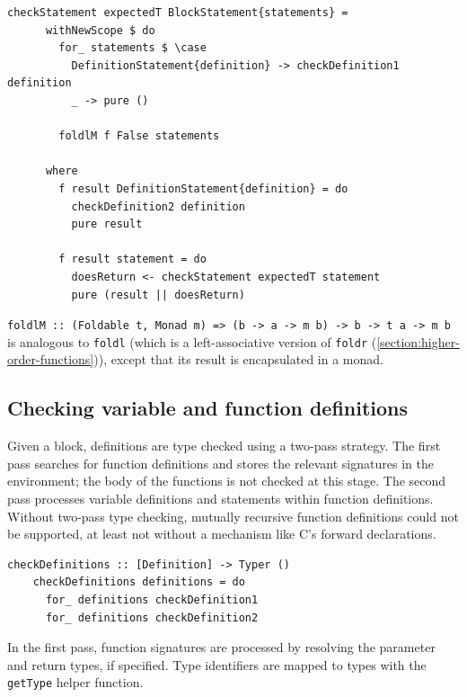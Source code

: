\documentclass[UdineBachThesis,american,11pt]{PhdThesis}
\begin{document}
  \begin{Verbatim}[gobble=4,fontsize=\small]
    checkStatement expectedT BlockStatement{statements} =
      withNewScope $ do
        for_ statements $ \case
          DefinitionStatement{definition} -> checkDefinition1 definition
          _ -> pure ()

        foldlM f False statements

      where
        f result DefinitionStatement{definition} = do
          checkDefinition2 definition
          pure result

        f result statement = do
          doesReturn <- checkStatement expectedT statement
          pure (result || doesReturn)
  \end{Verbatim}

  \mbox{\texttt{foldlM :: (Foldable t, Monad m) => (b -> a -> m b) -> b -> t a -> m b}}
  is analogous to \mbox{\texttt{foldl}} (which is a left-associative version of
  \mbox{\texttt{foldr}} (\autoref{section:higher-order-functions})), except that
  its result is encapsulated in a monad.

  \subsection{Checking variable and function definitions}

  Given a block, definitions are type checked using a two-pass strategy. The
  first pass searches for function definitions and stores the relevant
  signatures in the environment; the body of the functions is not checked at
  this stage. The second pass processes variable definitions and statements
  within function definitions. Without two-pass type checking, mutually
  recursive function definitions could not be supported, at least not without a
  mechanism like C's forward declarations.

  \begin{Verbatim}[gobble=4,fontsize=\small]
    checkDefinitions :: [Definition] -> Typer ()
    checkDefinitions definitions = do
      for_ definitions checkDefinition1
      for_ definitions checkDefinition2
  \end{Verbatim}

  In the first pass, function signatures are processed by resolving the
  parameter and return types, if specified. Type identifiers are mapped to types
  with the \mbox{\texttt{getType}} helper function.
\end{document}

